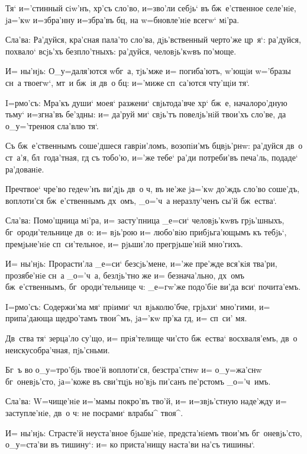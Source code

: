 Тя` и='стинный сiw'нъ, хр'съ сло'во, и=зво'ли 
себjь` въ бж~е'ственное селе'нiе, jа='кw и=збра'нну 
и=збра'въ бц, на w=бновле'нiе всегw` мi'ра.

Сла'ва: Ра'дуйся, кра'сная пала'то сло'ва, 
дjь'вственный черто'же цр~я`: ра'дуйся, похвало` всjь'хъ 
безпло'тныхъ: ра'дуйся, человjь'кwвъ по'моще.

И= ны'нjь: О_у=даля'ются w\т бг~а, тjь'мже и= 
погиба'ютъ, w'ющiи w='бразы сн~а твоегw`, мт~и 
бж~iя дв~о бц: и='миже сп~са'ются чту'щiи тя`.


I=рмо'съ: Мра'къ души` моея` разжени` свjьтода'вче 
хр` бж~е, началоро'дную тьму` и=згна'въ бе'здны: и= 
да'руй ми` свjь'тъ повелjь'нiй твои'хъ сло'ве, да 
о_у='тренюя сла'влю тя`.

Съ бж~е'ственнымъ соше'дшеся гаврiи'ломъ, возопiи'мъ 
бц вjь'рнw: ра'дуйся дв~о ст~а'я, бл~года'тная, гд 
съ тобо'ю, и='же тебе` ра'ди потреби'въ печа'ль, подаде` 
ра'дованiе.

Преч твое` чре'во гедеw'нъ ви'дjь дв~о ч, въ 
не'же jа='кw до'ждь сло'во соше'дъ, воплоти'ся 
бж~е'ственнымъ дх~омъ, _о='ч~а неразлу'ченъ сы'й 
бж~ества`.

Сла'ва: Помо'щница мi'ра, и= засту'пница _е=си` 
человjь'кwвъ грjь'шныхъ, бг~ороди'тельнице дв~о: и= 
вjь'рою и= любо'вiю прибjьга'ющымъ къ тебjь`, 
премjьне'нiе сп~си'тельное, и= рjьши'ло прегрjьше'нiй 
мно'гихъ.

И= ны'нjь: Прорасти'ла _е=си` без\ъ сjь'мене, и='же 
пре'жде вся'кiя тва'ри, прозябе'нiе сн~а _о='ч~а, 
безлjь'тно же и= безнача'льно, дх~омъ бж~е'ственнымъ, 
бг~ороди'тельнице ч: _е=гw'же подо'бiе ви'да вси` 
почита'емъ.


I=рмо'съ: Содержи'ма мя` прiими` чл~вjьколю'бче, 
грjьхи` мно'гими, и= припа'дающа щедро'тамъ твои^мъ, 
jа='кw пр'ка гд, и= сп~си' мя.

Дв~ства тя` зерца'ло су'що, и= прiя'телище чи'сто 
бж~ества` восхваля'емъ, дв~о неискусобра'чная, пjь'сньми.

Бг~ъ во о_у=тро'бjь твое'й воплоти'ся, безстра'стнw и= 
о_у=жа'снw бг~оневjь'сто, jа='коже въ сви'тцjь но'вjь 
пи'санъ пе'рстомъ _о='ч~имъ.

Сла'ва: W=чище'нiе и='мамы покро'въ тво'й, и= 
и=звjь'стную наде'жду и= заступле'нiе, дв~о ч: не 
посрами` вл рабы^ твоя^.

И= ны'нjь: Страсте'й неуста'вное бjьше'нiе, 
предста'нiемъ твои'мъ бг~оневjь'сто, о_у=ста'ви въ 
тишину`: и= ко приста'нищу наста'ви на'съ тишины`.

